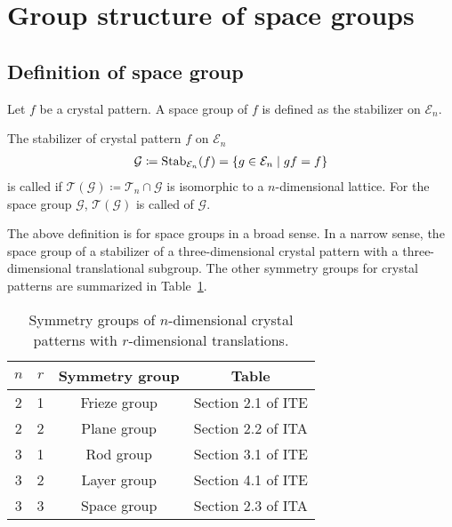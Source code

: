 \section{\label{sec:group_structure}Group structure of space groups}

\subsection{\label{sec:def_space_group}Definition of space group}

Let $f$ be a crystal pattern.
A space group of $f$ is defined as the stabilizer on $\mathcal{E}_{n}$.

\begin{screen}
  \begin{defn}
    The stabilizer of crystal pattern $f$ on $\mathcal{E}_{n}$
    \begin{align}
      \mathcal{G} \coloneqq \mathrm{Stab}_{\mathcal{E}_{n}} (f) = \left\{  g \in \mathcal{E}_{n}  \mathrel{}\middle|\mathrel{}  g f = f  \right\}
    \end{align}
    is called  if $\mathcal{T}(\mathcal{G}) \coloneqq \mathcal{T}_{n} \cap \mathcal{G}$ is isomorphic to a $n$-dimensional lattice.
    For the space group $\mathcal{G}$, $\mathcal{T}(\mathcal{G})$ is called  of $\mathcal{G}$.
  \end{defn}
\end{screen}

The above definition is for space groups in a broad sense.
In a narrow sense, the space group of a stabilizer of a three-dimensional crystal pattern with a three-dimensional translational subgroup.
The other symmetry groups for crystal patterns are summarized in Table~\ref{tab:symmetry_groups}.

\begin{table}[htb]
  \centering
  \caption{Symmetry groups of $n$-dimensional crystal patterns with $r$-dimensional translations.}
  \label{tab:symmetry_groups}
  \begin{tabular}[h]{cccc}
    $n$ & $r$ & Symmetry group & Table \\
    \hline
    2 & 1 & Frieze group & Section 2.1 of ITE \cite{ITE2010} \\
    2 & 2 & Plane group  & Section 2.2 of ITA \cite{ITA2016} \\
    3 & 1 & Rod group    & Section 3.1 of ITE \cite{ITE2010} \\
    3 & 2 & Layer group  & Section 4.1 of ITE \cite{ITE2010} \\
    3 & 3 & Space group  & Section 2.3 of ITA \cite{ITA2016} \\
  \end{tabular}
\end{table}

